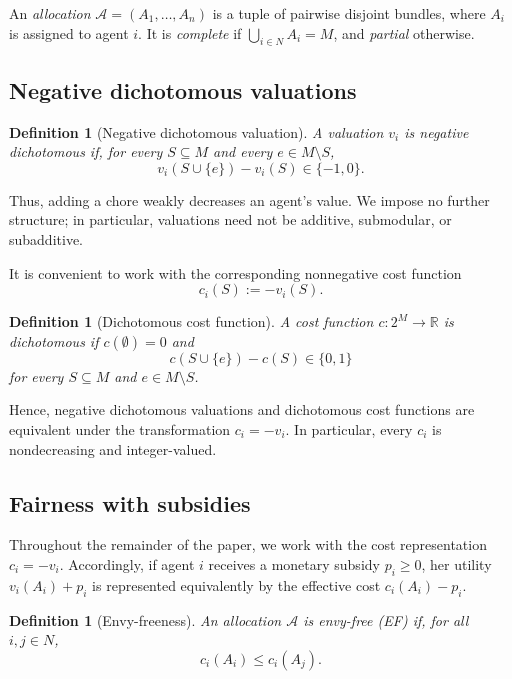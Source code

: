 \documentclass[sigconf,anonymous]{aamas}
\newcommand{\agents}{N}
\newcommand{\items}{M}
\newcommand{\alloc}{\mathcal{A}}
\newcommand{\bundle}[1]{A_{#1}}
\newcommand{\cost}{c}
\newcommand{\R}{\mathbb{R}}
\theoremstyle{acmplain}
\theoremstyle{acmdefinition}
\newtheorem{definition}[theorem]{Definition}
\theoremstyle{acmplain}
\begin{document}
An \emph{allocation}
$\alloc=(\bundle{1},\ldots,\bundle{n})$ is a tuple of pairwise disjoint bundles, where $\bundle{i}$ is assigned to agent $i$. It is \emph{complete} if $\bigcup_{i\in\agents}\bundle{i}=\items$, and \emph{partial} otherwise.

\subsection{Negative dichotomous valuations}

\begin{definition}[Negative dichotomous valuation]
\label{def:negdich}
A valuation $v_i$ is \emph{negative dichotomous} if, for every
$S\subseteq\items$ and every $e\in\items\setminus S$,
\[
v_i(S\cup\{e\})-v_i(S)\in\{-1,0\}.
\]
\end{definition}

Thus, adding a chore weakly decreases an agent's value. We impose
no further structure; in particular, valuations need not be
additive, submodular, or subadditive.

It is convenient to work with the corresponding nonnegative cost
function
\[
\cost_i(S):=-v_i(S).
\]

\begin{definition}[Dichotomous cost function]
\label{def:dichcost}
A cost function $\cost:2^{\items}\to\R$ is \emph{dichotomous} if
$\cost(\emptyset)=0$ and
\[
\cost(S\cup\{e\})-\cost(S)\in\{0,1\}
\]
for every $S\subseteq\items$ and $e\in\items\setminus S$.
\end{definition}

Hence, negative dichotomous valuations and dichotomous cost functions are equivalent under the transformation $\cost_i=-v_i$. In particular, every $\cost_i$ is nondecreasing and integer-valued. 

\subsection{Fairness with subsidies}
Throughout the remainder of the paper, we work with the cost representation $c_i=-v_i$. Accordingly, if agent $i$ receives a monetary subsidy $p_i\geq 0$, her utility $v_i(A_i)+p_i$ is represented equivalently by the effective cost $c_i(A_i)-p_i$.
\begin{definition}[Envy-freeness]
\label{def:ef}
An allocation $\alloc$ is \emph{envy-free} (EF) if, for all
$i,j\in\agents$,
\[
\cost_i(\bundle{i})\le \cost_i(\bundle{j}).
\]
\end{definition}
\end{document}
